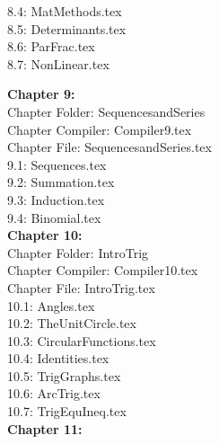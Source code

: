 \documentclass[11pt]{book}
\theoremstyle{definition}  %
\begin{document}
\begin{multicols}{2}
8.4:  MatMethods.tex \\

8.5:  Determinants.tex \\

8.6:  ParFrac.tex \\

8.7:  NonLinear.tex \\


\newpage

\textbf{Chapter 9:} \\


Chapter Folder:  SequencesandSeries \\

Chapter Compiler:  Compiler9.tex \\

Chapter File:  SequencesandSeries.tex \\

9.1:  Sequences.tex \\

9.2:  Summation.tex \\

9.3:  Induction.tex \\

9.4:  Binomial.tex \\

\textbf{Chapter 10:} \\


Chapter Folder:  IntroTrig \\

Chapter Compiler:  Compiler10.tex \\

Chapter File:  IntroTrig.tex \\

10.1:  Angles.tex \\

10.2:  TheUnitCircle.tex \\

10.3:  CircularFunctions.tex \\

10.4:  Identities.tex \\

10.5:  TrigGraphs.tex \\

10.6:  ArcTrig.tex \\

10.7:  TrigEquIneq.tex \\


\textbf{Chapter 11:} \\


\end{multicols}
\end{document}
